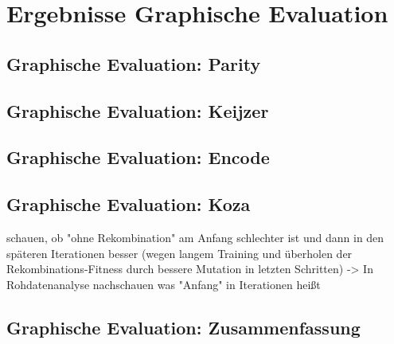\section{Ergebnisse Graphische Evaluation}
\label{sec:ergebnissePlots}

\subsection{Graphische Evaluation: Parity}
\label{subsec:plotsParity}

\subsection{Graphische Evaluation: Keijzer}
\label{subsec:plotsKeijzer}

\subsection{Graphische Evaluation: Encode}
\label{subsec:plotsEncode}

\subsection{Graphische Evaluation: Koza}
\label{subsec:plotsKoza}

schauen, ob "ohne Rekombination" am Anfang schlechter ist und dann in den späteren Iterationen besser (wegen langem Training und überholen der Rekombinations-Fitness durch bessere Mutation in letzten Schritten) -> In Rohdatenanalyse nachschauen was "Anfang" in Iterationen heißt

\subsection{Graphische Evaluation: Zusammenfassung}
\label{subsec:plotsZusammenfassung}

